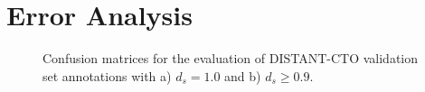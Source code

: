 \documentclass[11pt]{article}
\begin{document}
\section{Error Analysis}
\label{subsec:err}
%
\begin{figure}[!tbp]
  \centering
  \hfill
  \caption{Confusion matrices for the evaluation of DISTANT-CTO validation set annotations with a) $d_s = 1.0$ and b) $d_s \geq 0.9$.}
\end{figure}
%
%
%
\end{document}

